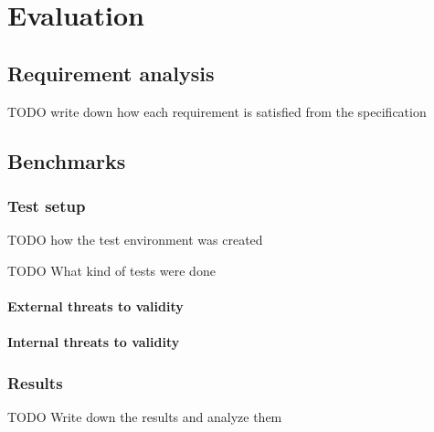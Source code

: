 \chapter{Evaluation}

	\section{Requirement analysis}
	TODO write down how each requirement is satisfied from the specification

	\section{Benchmarks}

	\subsection{Test setup}
	TODO how the test environment was created

	TODO What kind of tests were done

		\subsubsection{External threats to validity}

		\subsubsection{Internal threats to validity}
	

	\subsection{Results}
	TODO Write down the results and analyze them